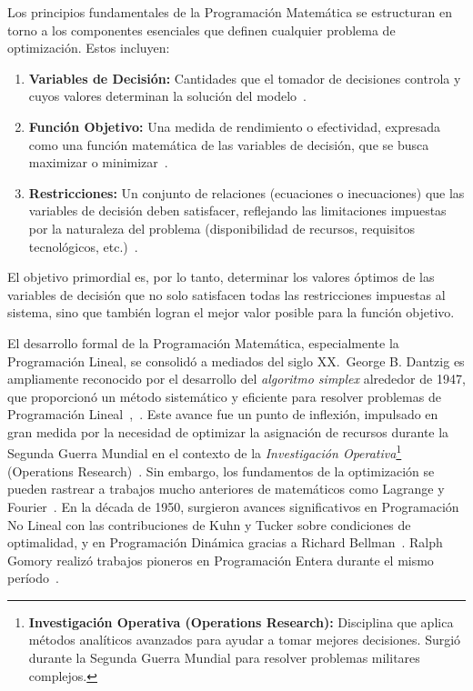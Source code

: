 Los principios fundamentales de la Programación Matemática se estructuran en torno a los componentes esenciales que definen cualquier problema de optimización. Estos incluyen:
\begin{enumerate}
    \item \textbf{Variables de Decisión:} Cantidades que el tomador de decisiones controla y cuyos valores determinan la solución del modelo~\cite[p.~181]{bradley1977applied}.
    \item \textbf{Función Objetivo:} Una medida de rendimiento o efectividad, expresada como una función matemática de las variables de decisión, que se busca maximizar o minimizar~\cite[p.~181]{bradley1977applied}.
    \item \textbf{Restricciones:} Un conjunto de relaciones (ecuaciones o inecuaciones) que las variables de decisión deben satisfacer, reflejando las limitaciones impuestas por la naturaleza del problema (disponibilidad de recursos, requisitos tecnológicos, etc.)~\cite[p.~181]{bradley1977applied}.
\end{enumerate}

El objetivo primordial es, por lo tanto, determinar los valores óptimos de las variables de decisión que no solo satisfacen todas las restricciones impuestas al sistema, sino que también logran el mejor valor posible para la función objetivo.

El desarrollo formal de la Programación Matemática, especialmente la Programación Lineal, se consolidó a mediados del siglo XX.\ George B. Dantzig es ampliamente reconocido por el desarrollo del \textit{algoritmo simplex} alrededor de 1947, que proporcionó un método sistemático y eficiente para resolver problemas de Programación Lineal~\cite[p.~2]{sinha2006},~\cite[p.~1]{bradley1977applied}. Este avance fue un punto de inflexión, impulsado en gran medida por la necesidad de optimizar la asignación de recursos durante la Segunda Guerra Mundial en el contexto de la \textit{Investigación Operativa}\footnote{\textbf{Investigación Operativa (Operations Research):} Disciplina que aplica métodos analíticos avanzados para ayudar a tomar mejores decisiones. Surgió durante la Segunda Guerra Mundial para resolver problemas militares complejos.} (Operations Research)~\cite[p.~1]{sinha2006}. Sin embargo, los fundamentos de la optimización se pueden rastrear a trabajos mucho anteriores de matemáticos como Lagrange y Fourier~\cite[p.~1]{sinha2006}. En la década de 1950, surgieron avances significativos en Programación No Lineal con las contribuciones de Kuhn y Tucker sobre condiciones de optimalidad, y en Programación Dinámica gracias a Richard Bellman~\cite[p.~9]{sinha2006}. Ralph Gomory realizó trabajos pioneros en Programación Entera durante el mismo período~\cite[p.~9]{sinha2006}.

